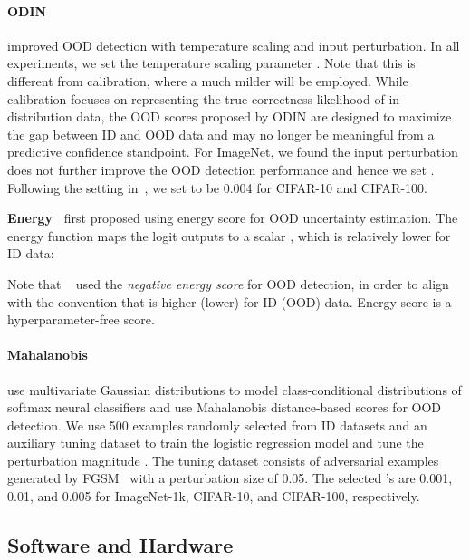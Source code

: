 \documentclass{article}
\begin{document}
\paragraph{ODIN~\cite{liang2018enhancing}} \citeauthor{liang2018enhancing} improved OOD detection with temperature scaling and input perturbation. In all experiments, we set the temperature scaling parameter . Note that this is different from calibration, where a much milder  will be employed. While calibration focuses on representing the
true correctness likelihood of in-distribution data, the OOD scores proposed by ODIN are designed to maximize the gap between ID and OOD data and may no longer be meaningful from a predictive confidence standpoint.
For ImageNet, we found the input perturbation does not further improve the OOD detection performance and hence we set . 
Following the setting in~\cite{liang2018enhancing}, we set  to be 0.004 for CIFAR-10 and CIFAR-100.



\textbf{Energy~\cite{liu2020energy}} \citeauthor{liu2020energy} first proposed using energy score for OOD uncertainty estimation. The energy function  maps the logit outputs to a scalar , which is relatively lower for ID data:

Note that \citeauthor{liu2020energy}~\cite{liu2020energy} used the \emph{negative energy score} for OOD detection, in order to align with the convention that  is higher (lower) for ID (OOD) data. Energy score is a hyperparameter-free score. 

\paragraph{Mahalanobis~\cite{lee2018simple}} \citeauthor{lee2018simple} use multivariate Gaussian distributions to model class-conditional distributions of softmax neural classifiers and use Mahalanobis distance-based scores for OOD detection. We use 500 examples randomly selected from ID datasets and an auxiliary tuning dataset to train the logistic regression model and tune the perturbation magnitude . The tuning dataset consists of adversarial examples generated by FGSM~\cite{goodfellow2014explaining} with a perturbation size of 0.05.\@
The selected 's are 0.001, 0.01, and 0.005 for ImageNet-1k, CIFAR-10, and CIFAR-100, respectively.








\subsection{Software and Hardware}
\end{document}
